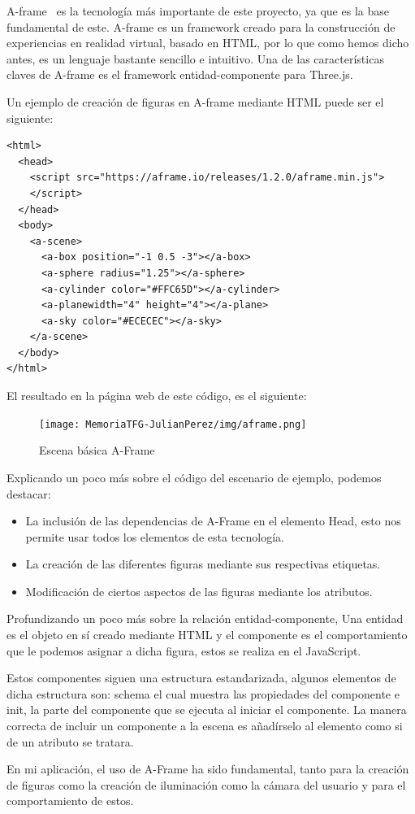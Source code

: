 \documentclass[a4paper, 12pt]{book}
\begin{document}
A-frame~\cite{a} es la tecnología más importante de este proyecto, ya que es la base fundamental de este. A-frame es un framework creado para la construcción de experiencias en realidad virtual, basado en HTML, por lo que como hemos dicho antes, es un lenguaje bastante sencillo e intuitivo. Una de las características claves de A-frame es el framework entidad-componente para Three.js.

Un ejemplo de creación de figuras en A-frame mediante HTML puede ser el siguiente:
\begin{verbatim}
<html>
  <head>
    <script src="https://aframe.io/releases/1.2.0/aframe.min.js">
    </script>
  </head>
  <body>
    <a-scene>
      <a-box position="-1 0.5 -3"></a-box>
      <a-sphere radius="1.25"></a-sphere>
      <a-cylinder color="#FFC65D"></a-cylinder>
      <a-planewidth="4" height="4"></a-plane>
      <a-sky color="#ECECEC"></a-sky>
    </a-scene>
  </body>
</html>
\end{verbatim}
El resultado en la página web de este código, es el siguiente:
\begin{figure}[H]
  \centering
  \texttt{[image: MemoriaTFG-JulianPerez/img/aframe.png]}
  \caption{Escena básica A-Frame}\label{aframe}
\end{figure}
Explicando un poco más sobre el código del escenario de ejemplo, podemos destacar: 
\begin{itemize}
    \item La inclusión de las dependencias de A-Frame en el elemento Head, esto nos permite usar todos los elementos de esta tecnología.
    \item La creación de las diferentes figuras mediante sus respectivas etiquetas.
    \item Modificación de ciertos aspectos de las figuras mediante los atributos.
\end{itemize}
Profundizando un poco más sobre la relación entidad-componente, Una entidad es el objeto en sí creado mediante HTML y el componente es el comportamiento que le podemos asignar a dicha figura, estos se realiza en el JavaScript. 

Estos componentes siguen una estructura estandarizada, algunos elementos de dicha estructura son: schema el cual muestra las propiedades del componente e init, la parte del componente que se ejecuta al iniciar el componente. La manera correcta de incluir un componente a la escena es añadírselo al elemento como si de un atributo se tratara.

En mi aplicación, el uso de A-Frame ha sido fundamental, tanto para la creación de figuras como la creación de iluminación como la cámara del usuario y para el comportamiento de estos.
\end{document}
